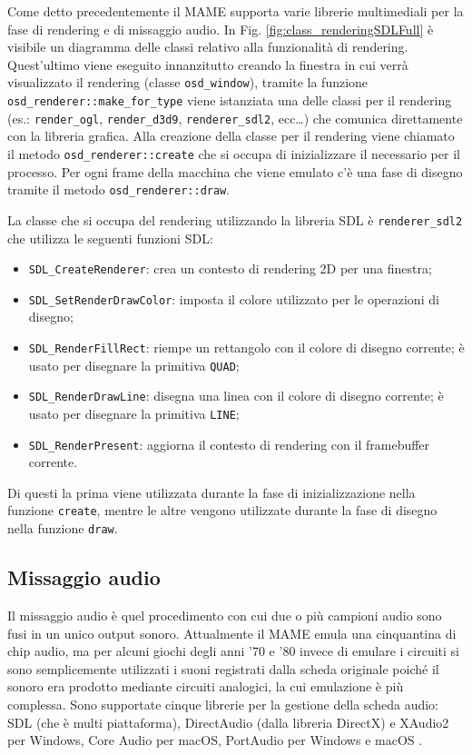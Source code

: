 Come detto precedentemente il MAME supporta varie librerie multimediali per la fase di rendering e di missaggio audio. In Fig. \ref{fig:class_renderingSDLFull} è visibile un diagramma delle classi relativo alla funzionalità di rendering. Quest'ultimo viene eseguito innanzitutto creando la finestra in cui verrà visualizzato il rendering (classe \verb|osd_window|), tramite la funzione \verb|osd_renderer::make_for_type| viene istanziata una delle classi per il rendering (es.: \verb|render_ogl|, \verb|render_d3d9|, \verb|renderer_sdl2|, ecc\dots) che comunica direttamente con la libreria grafica. Alla creazione della classe per il rendering viene chiamato il metodo \verb|osd_renderer::create| che si occupa di inizializzare il necessario per il processo. Per ogni frame della macchina che viene emulato c'è una fase di disegno tramite il metodo \verb|osd_renderer::draw|.

La classe che si occupa del rendering utilizzando la libreria SDL è \verb|renderer_sdl2| che utilizza le seguenti funzioni SDL:

\begin{itemize}	
	\item \verb|SDL_CreateRenderer|: crea un contesto di rendering 2D per una finestra;
	\item \verb|SDL_SetRenderDrawColor|: imposta il colore utilizzato per le operazioni di disegno;
	\item \verb|SDL_RenderFillRect|: riempe un rettangolo con il colore di disegno corrente; è usato per disegnare la primitiva \verb|QUAD|;
	\item \verb|SDL_RenderDrawLine|: disegna una linea con il colore di disegno corrente; è usato per disegnare la primitiva \verb|LINE|;
	\item \verb|SDL_RenderPresent|: aggiorna il contesto di rendering con il framebuffer corrente.
\end{itemize}

Di questi la prima viene utilizzata durante la fase di inizializzazione nella funzione \verb|create|, mentre le altre vengono utilizzate durante la fase di disegno nella funzione \verb|draw|.



\subsection{Missaggio audio} \label{chap:Missaggio_audio}
Il missaggio audio è quel procedimento con cui due o più campioni audio sono fusi in un unico output sonoro. Attualmente il MAME emula una cinquantina di chip audio, ma per alcuni giochi degli anni '70 e '80 invece di emulare i circuiti si sono semplicemente utilizzati i suoni registrati dalla scheda originale poiché il sonoro era prodotto mediante circuiti analogici, la cui emulazione è più complessa. Sono supportate cinque librerie per la gestione della scheda audio: SDL (che è multi piattaforma), DirectAudio (dalla libreria DirectX) e XAudio2 per Windows, Core Audio per macOS, PortAudio per Windows e macOS \parencite{Il_progetto_MAME}.

